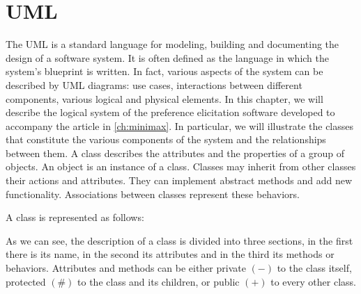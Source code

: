 \section{UML}

The \ac{UML} is a standard language for modeling, building and documenting the design of a software system. It is often defined as the language in which the system's blueprint is written. In fact, various aspects of the system can be described by UML diagrams: use cases, interactions between different components, various logical and physical elements.
In this chapter, we will describe the logical system of the preference elicitation software developed to accompany the article in \cref{ch:minimax}.
In particular, we will illustrate the classes that constitute the various components of the system and the relationships between them.
A class describes the attributes and the properties of a group of objects. An object is an instance of a class.
Classes may inherit from other classes their actions and attributes. They can implement abstract methods and add new functionality. Associations between classes represent these behaviors.

A class is represented as follows:

\begin{figure}[h]
	\centering
	
	\label{uml:example}
\end{figure}


As we can see, the description of a class is divided into three sections, in the first there is its name, in the second its attributes and in the third its methods or behaviors. Attributes and methods can be either private $(-)$ to the class itself, protected $(\#)$ to the class and its children, or public $(+)$ to every other class.

